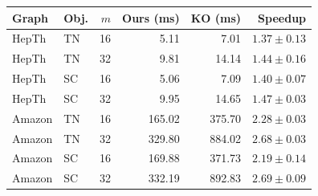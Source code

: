 \begin{tabular}{llrrrr}
\toprule
Graph & Obj. & $m$ & Ours (ms) & KO (ms) & Speedup \\
\midrule
HepTh & TN & 16 & 5.11 & 7.01 & $1.37\pm0.13$ \\
HepTh & TN & 32 & 9.81 & 14.14 & $1.44\pm0.16$ \\
HepTh & SC & 16 & 5.06 & 7.09 & $1.40\pm0.07$ \\
HepTh & SC & 32 & 9.95 & 14.65 & $1.47\pm0.03$ \\
Amazon & TN & 16 & 165.02 & 375.70 & $2.28\pm0.03$ \\
Amazon & TN & 32 & 329.80 & 884.02 & $2.68\pm0.03$ \\
Amazon & SC & 16 & 169.88 & 371.73 & $2.19\pm0.14$ \\
Amazon & SC & 32 & 332.19 & 892.83 & $2.69\pm0.09$ \\
\bottomrule
\end{tabular}
